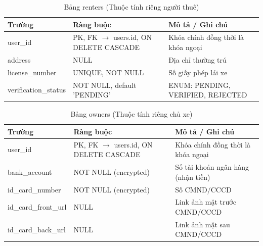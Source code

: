 \vspace{0.5cm}

\begin{longtable}{p{\colField} p{\colConst} p{\colDesc}}
    \caption{Bảng renters (Thuộc tính riêng người thuê)} \label{tab:renters} \\
    \toprule
    \textbf{Trường} & \textbf{Ràng buộc} & \textbf{Mô tả / Ghi chú} \\
    \midrule
    \endfirsthead
    \bottomrule
    \endlastfoot

    user\_id & PK, FK $\to$ users.id, ON DELETE CASCADE & Khóa chính đồng thời là khóa ngoại \\
    address & NULL & Địa chỉ thường trú \\
    license\_number & UNIQUE, NOT NULL & Số giấy phép lái xe \\
    verification\_status & NOT NULL, default 'PENDING' & ENUM: PENDING, VERIFIED, REJECTED \\
\end{longtable}

\vspace{0.5cm}

\begin{longtable}{p{\colField} p{\colConst} p{\colDesc}}
    \caption{Bảng owners (Thuộc tính riêng chủ xe)} \label{tab:owners} \\
    \toprule
    \textbf{Trường} & \textbf{Ràng buộc} & \textbf{Mô tả / Ghi chú} \\
    \midrule
    \endfirsthead
    \bottomrule
    \endlastfoot

    user\_id & PK, FK $\to$ users.id, ON DELETE CASCADE & Khóa chính đồng thời là khóa ngoại \\
    bank\_account & NOT NULL (encrypted) & Số tài khoản ngân hàng (nhận tiền) \\
    id\_card\_number & NOT NULL (encrypted) & Số CMND/CCCD \\
    id\_card\_front\_url & NULL & Link ảnh mặt trước CMND/CCCD \\
    id\_card\_back\_url & NULL & Link ảnh mặt sau CMND/CCCD \\
\end{longtable}

\vspace{0.5cm}

